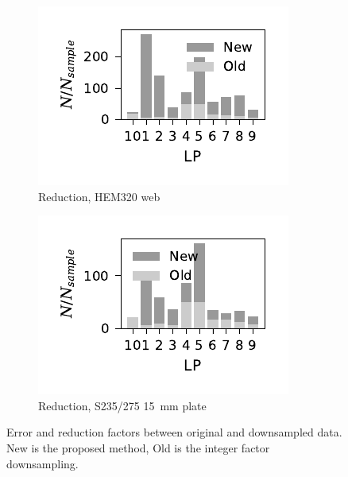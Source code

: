 \documentclass[a4paper,11pt]{article}
\begin{document}
\begin{figure}
    \begin{subfigure}[b]{0.45\linewidth}
        \centering
        \includegraphics{N_reduction_WP3_HEM320_C_CRM20.pdf}
        \caption{Reduction, HEM320 web}
        \label{fig:hem320-reduction}
    \end{subfigure}
    \begin{subfigure}[b]{0.45\linewidth}
        \centering
        \includegraphics{N_reduction_S235275_Plate15.pdf}
        \caption{Reduction, S235/275 15~mm plate}
        \label{fig:s235275-reduction}
    \end{subfigure}
    \caption{Error and reduction factors between original and downsampled data. New is the proposed method, Old is the integer factor downsampling.}
    \label{fig:error-and-reduction}
\end{figure}
\end{document}
